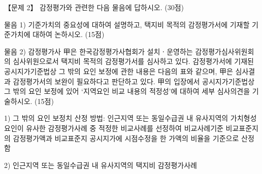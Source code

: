 \begin{longquestion}{【문제 2】}
감정평가와 관련한 다음 물음에 답하시오. (30점) \par
\medskip\noindent 물음 1) 기준가치의 중요성에 대하여 설명하고, 택지비 목적의 감정평가서에 기재할 기준가치에 대하여 논하시오. (15점) \par
\medskip\noindent 물음 2) 감정평가사 甲은 한국감정평가사협회가 설치ㆍ운영하는 감정평가심사위원회의 심사위원으로서 택지비 목적의 감정평가서를 심사하고 있다. 감정평가서에 기재된 공시지가기준법상 그 밖의 요인 보정에 관한 내용은 다음의 표와 같으며, 甲은 심사결과 감정평가서의 보완이 필요하다고 판단하고 있다. 甲의 입장에서 공시지가기준법상 그 밖의 요인 보정에 있어 ‘지역요인 비교 내용의 적정성’에 대하여 세부 심사의견을 기술하시오. (15점) \par
\begin{framedtext}
1) 그 밖의 요인 보정치 산정 방법: 인근지역 또는 동일수급권 내 유사지역의 가치형성요인이 유사한 감정평가사례 중 적정한 비교사례를 선정하여 비교사례기준 비교표준지의 감정평가액과 비교표준지 공시지가에 시점수정을 한 가액의 비율을 기준으로 산정함 \par
2) 인근지역 또는 동일수급권 내 유사지역의 택지비 감정평가사례 \par
{\small\centering
{}\par}

\end{framedtext}
\end{longquestion}
